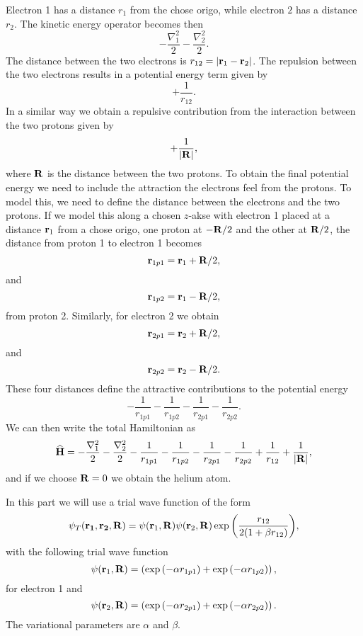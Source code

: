 \documentclass[10pt]{article}
\newcommand{\be}{\begin{equation}}
\newcommand{\ee}{\end{equation}}
\newcommand{\OP}[1]{{\bf\widehat{#1}}}
\begin{document}
Electron 1 has a distance $r_1$ from the chose origo, while  electron $2$
has a distance $r_2$. 
The kinetic energy operator becomes then
\be
   -\frac{\nabla_1^2}{2}-\frac{\nabla_2^2}{2}.
\ee
The distance between the two electrons is
$r_{12}=|{\bf r}_1-{\bf r}_2|$. 
The repulsion between the two electrons results in a potential energy term given by
\be
               +\frac{1}{r_{12}}.
\ee
In a similar way we obtain a repulsive contribution from the interaction between the two 
protons given by
\be
               +\frac{1}{|{\bf R}|},
\ee
where ${\bf R}$ is the distance between the two protons.
To obtain the final potential energy we need to include the attraction the electrons feel from the protons.
To model this, we need to define the distance between the electrons and the two protons.
If we model this along a 
chosen $z$-akse with electron 1 placed at a distance 
${\bf r}_1$ from a chose origo, one proton at $-{\bf R}/2$
and the other at  ${\bf R}/2$, 
the distance from proton 1 to electron 1 becomes
\be
{\bf r}_{1p1}={\bf r}_1+ {\bf R}/2,
\ee
and
\be
{\bf r}_{1p2}={\bf r}_1- {\bf R}/2,
\ee
from proton 2.
Similarly, for electron 2 we obtain
\be
{\bf r}_{2p1}={\bf r}_2+{\bf R}/2,
\ee
and
\be
{\bf r}_{2p2}={\bf r}_2-{\bf R}/2.
\ee
These four distances define the attractive contributions to the potential energy
\be
   -\frac{1}{r_{1p1}}-\frac{1}{r_{1p2}}-\frac{1}{r_{2p1}}-\frac{1}{r_{2p2}}.
\ee
We can then write the total Hamiltonian as 
\be
   \OP{H}=-\frac{\nabla_1^2}{2}-\frac{\nabla_2^2}{2}
   -\frac{1}{r_{1p1}}-\frac{1}{r_{1p2}}-\frac{1}{r_{2p1}}-\frac{1}{r_{2p2}}
               +\frac{1}{r_{12}}+\frac{1}{|{\bf R}|},
\ee
and if we choose ${\bf R}=0$ we obtain the helium atom.

In this part we will use a trial wave function of the form
\be
   \psi_{T}({\bf r_1},{\bf r_2}, {\bf R}) =
   \psi({\bf r}_1,{\bf R})\psi({\bf r}_2,{\bf R})
   \exp{\left(\frac{r_{12}}{2(1+\beta r_{12})}\right)},
\ee
with the following trial wave function 
\be
   \psi({\bf r}_1,{\bf R})=\left(\exp{(-\alpha r_{1p1})}
      +\exp{(-\alpha r_{1p2})}\right),
\ee
for electron 1 and
\be
   \psi({\bf r}_2,{\bf R})=\left(\exp{(-\alpha r_{2p1})}
      +\exp{(-\alpha r_{2p2})}\right).
\ee
The variational parameters are $\alpha$ and $\beta$.
\end{document}
